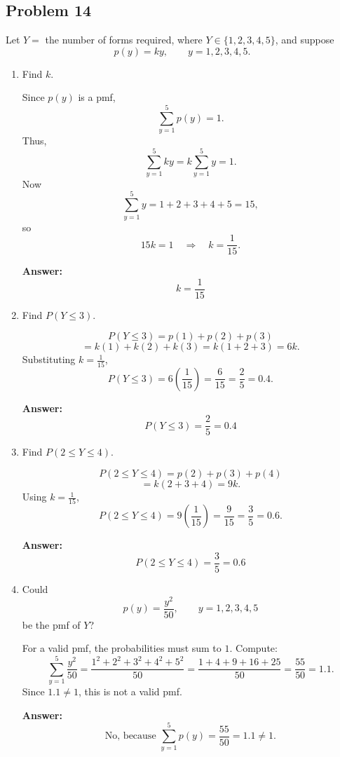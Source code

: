 \documentclass[11pt]{article}
\begin{document}
\subsection*{Problem 14}

Let \(Y=\) the number of forms required, where \(Y \in \{1,2,3,4,5\}\), and suppose
\[
p(y)=ky, \qquad y=1,2,3,4,5.
\]

\begin{enumerate}
    \item[(a)] Find \(k\).

    Since \(p(y)\) is a pmf,
    \[
    \sum_{y=1}^5 p(y)=1.
    \]
    Thus,
    \[
    \sum_{y=1}^5 ky = k\sum_{y=1}^5 y = 1.
    \]
    Now
    \[
    \sum_{y=1}^5 y = 1+2+3+4+5=15,
    \]
    so
    \[
    15k=1 \quad \Rightarrow \quad k=\frac{1}{15}.
    \]

    \textbf{Answer:}
    \[
    \boxed{k=\frac{1}{15}}
    \]

    \item[(b)] Find \(P(Y\le 3)\).

    \[
    P(Y\le 3)=p(1)+p(2)+p(3)
    \]
    \[
    =k(1)+k(2)+k(3)=k(1+2+3)=6k.
    \]
    Substituting \(k=\frac{1}{15}\),
    \[
    P(Y\le 3)=6\left(\frac{1}{15}\right)=\frac{6}{15}=\frac{2}{5}=0.4.
    \]

    \textbf{Answer:}
    \[
    \boxed{P(Y\le 3)=\frac{2}{5}=0.4}
    \]

    \item[(c)] Find \(P(2\le Y\le 4)\).

    \[
    P(2\le Y\le 4)=p(2)+p(3)+p(4)
    \]
    \[
    =k(2+3+4)=9k.
    \]
    Using \(k=\frac{1}{15}\),
    \[
    P(2\le Y\le 4)=9\left(\frac{1}{15}\right)=\frac{9}{15}=\frac{3}{5}=0.6.
    \]

    \textbf{Answer:}
    \[
    \boxed{P(2\le Y\le 4)=\frac{3}{5}=0.6}
    \]

    \item[(d)] Could
    \[
    p(y)=\frac{y^2}{50}, \qquad y=1,2,3,4,5
    \]
    be the pmf of \(Y\)?

    For a valid pmf, the probabilities must sum to \(1\). Compute:
    \[
    \sum_{y=1}^5 \frac{y^2}{50}
    =\frac{1^2+2^2+3^2+4^2+5^2}{50}
    =\frac{1+4+9+16+25}{50}
    =\frac{55}{50}
    =1.1.
    \]
    Since \(1.1 \ne 1\), this is not a valid pmf.

    \textbf{Answer:}
    \[
    \boxed{\text{No, because } \sum_{y=1}^5 p(y)=\frac{55}{50}=1.1 \ne 1.}
    \]
\end{enumerate}
\end{document}
